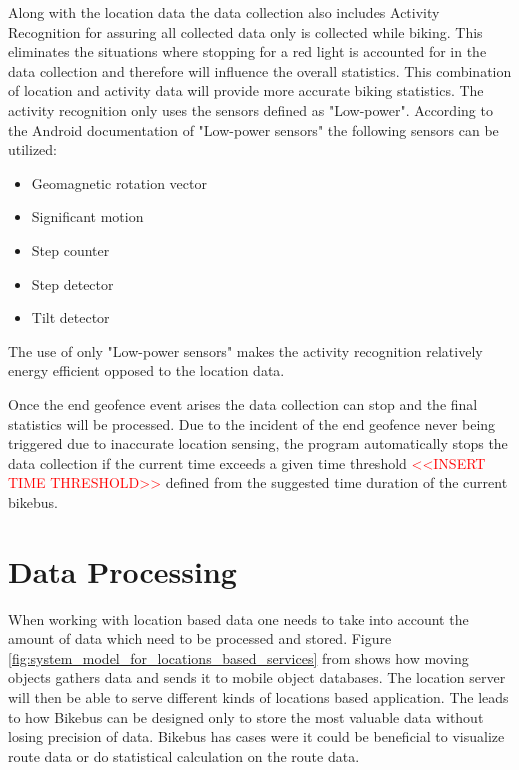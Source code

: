 Along with the location data the data collection also includes Activity Recognition for assuring all collected data only is collected while biking. This eliminates the situations where stopping for a red light is accounted for in the data collection and therefore will influence the overall statistics. This combination of location and activity data will provide more accurate biking statistics. 
The activity recognition only uses the sensors defined as "Low-power".
According to the Android documentation of "Low-power sensors" \cite{androidLow} the following sensors can be utilized:
\begin{itemize}
    \item Geomagnetic rotation vector
    \item Significant motion
    \item Step counter
    \item Step detector
    \item Tilt detector
\end{itemize}
The use of only "Low-power sensors" makes the activity recognition relatively energy efficient opposed to the location data.

Once the end geofence event arises the data collection can stop and the final statistics will be processed. Due to the incident of the end geofence never being triggered due to inaccurate location sensing, the program automatically stops the data collection if the current time exceeds a given time threshold \textcolor{red}{<<INSERT TIME THRESHOLD>>} defined from the suggested time duration of the current bikebus.

\section{Data Processing}

When working with location based data one needs to take into account the amount of data which need to be processed and stored. Figure \ref{fig:system_model_for_locations_based_services} from \cite{Lee2011} shows how moving objects gathers data and sends it to mobile object databases. The location server will then be able to serve different kinds of locations based application. The leads to how Bikebus can be designed only to store the most valuable data without losing precision of data. Bikebus has cases were it could be beneficial to visualize route data or do statistical calculation on the route data.   

